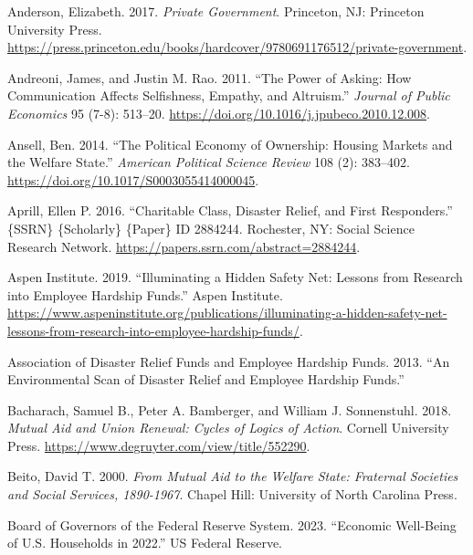 \documentclass[
  11pt,
  oneside]{article}
\newlength{\cslhangindent}
\newenvironment{CSLReferences}[2] %
 {\begin{list}{}{%
  \setlength{\itemindent}{0pt}
  \setlength{\leftmargin}{0pt}
  \setlength{\parsep}{0pt}
  \ifodd #1
   \setlength{\leftmargin}{\cslhangindent}
   \setlength{\itemindent}{-1\cslhangindent}
  \fi
  \setlength{\itemsep}{#2\baselineskip}}}
 {\end{list}}
\begin{document}
\begin{CSLReferences}{1}{0}
Anderson, Elizabeth. 2017. \emph{Private {Government}}. Princeton, NJ: Princeton University Press. \url{https://press.princeton.edu/books/hardcover/9780691176512/private-government}.

Andreoni, James, and Justin M. Rao. 2011. {``The Power of Asking: {How} Communication Affects Selfishness, Empathy, and Altruism.''} \emph{Journal of Public Economics} 95 (7-8): 513--20. \url{https://doi.org/10.1016/j.jpubeco.2010.12.008}.

Ansell, Ben. 2014. {``The {Political} {Economy} of {Ownership}: {Housing} {Markets} and the {Welfare} {State}.''} \emph{American Political Science Review} 108 (2): 383--402. \url{https://doi.org/10.1017/S0003055414000045}.

Aprill, Ellen P. 2016. {``Charitable {Class}, {Disaster} {Relief}, and {First} {Responders}.''} \{SSRN\} \{Scholarly\} \{Paper\} ID 2884244. Rochester, NY: Social Science Research Network. \url{https://papers.ssrn.com/abstract=2884244}.

Aspen Institute. 2019. {``Illuminating a {Hidden} {Safety} {Net}: {Lessons} from {Research} into {Employee} {Hardship} {Funds}.''} Aspen Institute. \url{https://www.aspeninstitute.org/publications/illuminating-a-hidden-safety-net-lessons-from-research-into-employee-hardship-funds/}.

Association of Disaster Relief Funds and Employee Hardship Funds. 2013. {``An {Environmental} {Scan} of {Disaster} {Relief} and {Employee} {Hardship} {Funds}.''}

Bacharach, Samuel B., Peter A. Bamberger, and William J. Sonnenstuhl. 2018. \emph{Mutual {Aid} and {Union} {Renewal}: {Cycles} of {Logics} of {Action}}. Cornell University Press. \url{https://www.degruyter.com/view/title/552290}.

Beito, David T. 2000. \emph{From {Mutual} {Aid} to the {Welfare} {State}: {Fraternal} {Societies} and {Social} {Services}, 1890-1967}. Chapel Hill: University of North Carolina Press.

Board of Governors of the Federal Reserve System. 2023. {``Economic {Well-Being} of {U}.{S}. {Households} in 2022.''} {US Federal Reserve}.


\end{CSLReferences}
\end{document}
